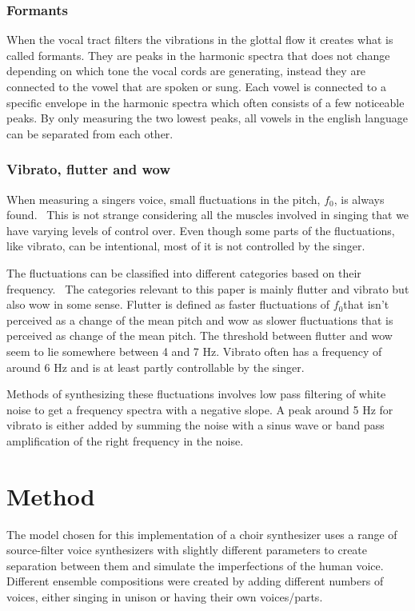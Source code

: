 \documentclass{article}
\newcommand{\fo}{$f_0$}
\begin{document}
\subsubsection{Formants}
When the vocal tract filters the vibrations in the glottal flow it creates what is called formants. They are peaks in the harmonic spectra that does not change depending on which tone the vocal cords are generating, instead they are connected to the vowel that are spoken or sung. Each vowel is connected to a specific envelope in the harmonic spectra which often consists of a few noticeable peaks. By only measuring the two lowest peaks, all vowels in the english language can be separated from each other.~\cite{ternstrom8:20, hall:91}

\subsubsection{Vibrato, flutter and wow}\label{subsec:vibflutwow}
When measuring a singers voice, small fluctuations in the pitch, \fo, is always found.~\cite{ternstrom:89} This is not strange considering all the muscles involved in singing that we have varying levels of control over. Even though some parts of the fluctuations, like vibrato, can be intentional, most of it is not controlled by the singer.

The fluctuations can be classified into different categories based on their frequency.~\cite{ternstrom:89} The categories relevant to this paper is mainly flutter and vibrato but also wow in some sense. Flutter is defined as faster fluctuations of \fo  that isn't perceived as a change of the mean pitch and wow as slower fluctuations that is perceived as change of the mean pitch. The threshold between flutter and wow seem to lie somewhere between 4 and 7 Hz. Vibrato often has a frequency of around 6 Hz and is at least partly controllable by the singer.

Methods of synthesizing these fluctuations involves low pass filtering of white noise to get a frequency spectra with a negative slope. A peak around 5 Hz for vibrato is either added by summing the noise with a sinus wave or band pass amplification of the right frequency in the noise.~\cite{ternstrom:88, ternstrom:99}

\section{Method}\label{sec:method}
The model chosen for this implementation of a choir synthesizer uses a range of source-filter voice synthesizers with slightly different parameters to create separation between them and simulate the imperfections of the human voice. Different ensemble compositions were created by adding different numbers of voices, either singing in unison or having their own voices/parts.
\end{document}
